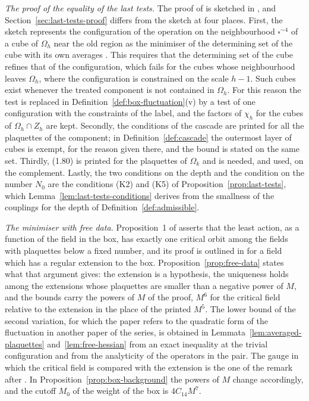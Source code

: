 \documentclass[11pt]{preprint}
\numberwithin{equation}{section}
\begin{document}
\emph{The proof of the equality of the last tests.} The proof of \cite[(1.89)]{BalabanLFR1} is sketched in \cite[pp.~198--200]{BalabanLFR1}, and Section~\ref{sec:last-tests-proof} differs from the sketch at four places. First, the sketch represents the configuration of the operation on the neighbourhood $\square^{\sim4}$ of a cube of $\Omega_h$ near the old region as the minimiser of the determining set of the cube with its own averages \cite[(1.90)]{BalabanLFR1}. This requires that the determining set of the cube refines that of the configuration, which fails for the cubes whose neighbourhood leaves $\Omega_h$, where the configuration is constrained on the scale $h - 1$. Such cubes exist whenever the treated component is not contained in $\Omega_h$. For this reason the test \cite[(1.88)]{BalabanLFR1} is replaced in Definition~\ref{def:box-fluctuation}(v) by a test of one configuration with the constraints of the label, and the factors of $\chi_h$ for the cubes of $\Omega_h \cap Z_h$ are kept. Secondly, the conditions \cite[(1.24)]{BalabanLFR1} of the cascade are printed for all the plaquettes of the component; in Definition~\ref{def:cascade} the outermost layer of cubes is exempt, for the reason given there, and the bound \cite[(1.80)]{BalabanLFR1} is stated on the same set. Thirdly, (1.80) is printed for the plaquettes of $\Omega_k$ and is needed, and used, on the complement. Lastly, the two conditions on the depth \cite[(1.94)]{BalabanLFR1} and the condition on the number $N_0$ \cite[p.~200]{BalabanLFR1} are the conditions (K2) and (K5) of Proposition~\ref{prop:last-tests}, which Lemma~\ref{lem:last-tests-conditions} derives from the smallness of the couplings for the depth of Definition~\ref{def:admissible}.

\emph{The minimiser with free data.} Proposition~1 of \cite[p.~194]{BalabanLFR1} asserts that the least action, as a function of the field in the box, has exactly one critical orbit among the fields with plaquettes below a fixed number, and its proof is outlined in \cite[pp.~357--359]{BalabanLFR2} for a field which has a regular extension to the box. Proposition~\ref{prop:free-data} states what that argument gives: the extension is a hypothesis, the uniqueness holds among the extensions whose plaquettes are smaller than a negative power of $M$, and the bounds carry the powers of $M$ of the proof, $M^6$ for the critical field relative to the extension in the place of the printed $M^5$. The lower bound \cite[(1.7)]{BalabanLFR2} of the second variation, for which the paper refers to the quadratic form of the fluctuation in another paper of the series, is obtained in Lemmata~\ref{lem:averaged-plaquettes} and~\ref{lem:free-hessian} from an exact inequality at the trivial configuration and from the analyticity of the operators in the pair. The gauge in which the critical field is compared with the extension is the one of the remark after \cite[(1.8)]{BalabanLFR2}. In Proposition~\ref{prop:box-background} the powers of $M$ change accordingly, and the cutoff $M_0$ of the weight of the box is $4C_{14}M^7$.
\end{document}
